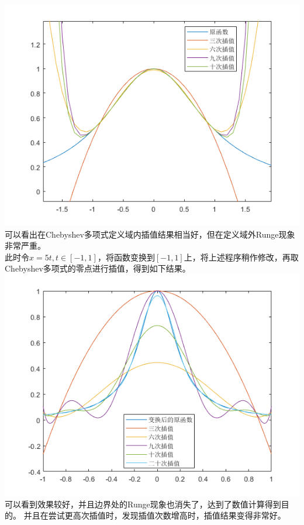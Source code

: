 \documentclass{article}
\begin{document}
\begin{itemize}
		\includegraphics[scale=1]{chebyshev1.png}\\
		可以看出在Chebyshev多项式定义域内插值结果相当好，但在定义域外Runge现象非常严重。\\
		此时令$x = 5t, t \in [-1, 1]$，将函数变换到$[-1, 1]$上，将上述程序稍作修改，再取Chebyshev多项式的零点进行插值，得到如下结果。\\
		\includegraphics[scale=1]{chebyshev3.png}\\
		可以看到效果较好，并且边界处的Runge现象也消失了，达到了数值计算得到目的。	并且在尝试更高次插值时，发现插值次数增高时，插值结果变得非常好。
	\end{itemize}
\end{document}
